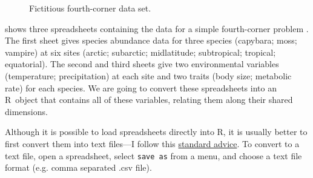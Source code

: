 \documentclass{article}
\newcommand{\R}{{\sf R}}
\newcommand{\code}[1]{\texttt{#1}}
\numberwithin{exercise}{section}
\begin{document}
\begin{figure}
\caption{Fictitious fourth-corner data set.}
\label{fig:spreadsheetfc}
\end{figure}shows three spreadsheets containing the data for a simple fourth-corner problem \citep{LegendreEtAl1997}.  The first sheet gives species abundance data for three species (capybara; moss; vampire) at six sites (arctic; subarctic; midlatitude; subtropical; tropical; equatorial).  The second and third sheets give two environmental variables (temperature; precipitation) at each site and two traits (body size; metabolic rate) for each species.  We are going to convert these spreadsheets into an \R\ object that contains all of these variables, relating them along their shared dimensions.

Although it is possible to load spreadsheets directly into \R, it is usually better to first convert them into text files---I follow this \href{http://cran.r-project.org/doc/manuals/R-data.html#Reading-Excel-spreadsheets}{standard advice}.  To convert to a text file, open a spreadsheet, select \code{save as} from a menu, and choose a text file format (e.g. comma separated .csv file).
\end{document}
